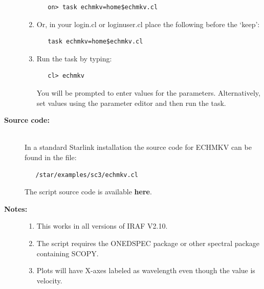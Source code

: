 \documentclass[twoside,11pt]{article}
\newenvironment{latexonly}{}{}
\newcommand{\htmlref}[2]{#1}
\begin{document}
\begin{description}
\begin{enumerate}
\begin{verbatim}
   on> task echmkv=home$echmkv.cl
\end{verbatim}

\item Or, in your login.cl or loginuser.cl place the following
      before the `keep':

\begin{verbatim}
   task echmkv=home$echmkv.cl
\end{verbatim}

\item Run the task by typing:

\begin{verbatim}
   cl> echmkv
\end{verbatim}

      You will be prompted
      to enter values for the parameters. Alternatively, set values
      using the parameter editor and then run the task.
\end{enumerate}

\item [{\bf Source code:}] \mbox{} \\
\begin{latexonly}
In a standard Starlink installation the source code for ECHMKV can be found
in the file:
\begin{verbatim}
   /star/examples/sc3/echmkv.cl
\end{verbatim}
\end{latexonly}
\begin{htmlonly}
      The script source code is available
      \htmlref{{\bf here}}{se_echmkv_source}.
\end{htmlonly}

\item [{\bf Notes:}] \mbox{}
\begin{enumerate}
\item This works in all versions of IRAF V2.10.

\item The script requires the ONEDSPEC package or other spectral
      package containing SCOPY.

\item Plots will have X-axes labeled as wavelength even though the
      value is velocity.
\end{enumerate}

\end{description}

\newpage
\end{document}
